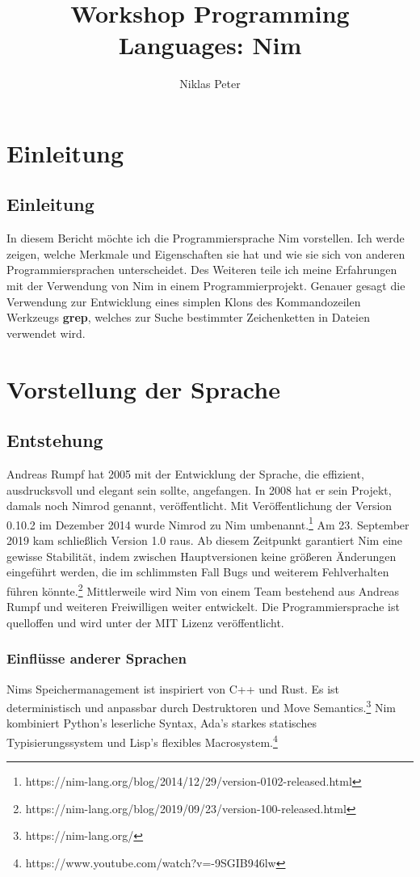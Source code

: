 \documentclass[11pt]{report}
\title{\textbf{Workshop Programming Languages: Nim}}
\author{Niklas Peter}
\date{}
\begin{document}
\maketitle
\tableofcontents


\chapter{Einleitung}
\section{Einleitung}
In diesem Bericht möchte ich die Programmiersprache Nim vorstellen. Ich werde zeigen, welche Merkmale und Eigenschaften sie hat und wie sie sich von anderen Programmiersprachen unterscheidet. Des Weiteren teile ich meine Erfahrungen mit der Verwendung von Nim in einem Programmierprojekt. Genauer gesagt die Verwendung zur Entwicklung eines simplen Klons des Kommandozeilen Werkzeugs \textbf{grep}, welches zur Suche bestimmter Zeichenketten in Dateien verwendet wird.



\chapter{Vorstellung der Sprache}

\section{Entstehung}
Andreas Rumpf hat 2005 mit der Entwicklung der Sprache, die effizient, ausdrucksvoll und elegant sein sollte, angefangen. In 2008 hat er sein Projekt, damals noch Nimrod genannt, veröffentlicht. Mit Veröffentlichung der Version 0.10.2 im Dezember 2014 wurde Nimrod zu Nim umbenannt.\footnote{https://nim-lang.org/blog/2014/12/29/version-0102-released.html} Am 23. September 2019 kam schließlich Version 1.0 raus. Ab diesem Zeitpunkt garantiert Nim eine gewisse Stabilität, indem zwischen Hauptversionen keine größeren Änderungen eingeführt werden, die im schlimmsten Fall Bugs und weiterem Fehlverhalten führen könnte.\footnote{https://nim-lang.org/blog/2019/09/23/version-100-released.html} Mittlerweile wird Nim von einem Team bestehend aus Andreas Rumpf und weiteren Freiwilligen weiter entwickelt. Die Programmiersprache ist quelloffen und wird unter der MIT Lizenz veröffentlicht.

\subsection{Einflüsse anderer Sprachen}
Nims Speichermanagement ist inspiriert von C++ und Rust. Es ist deterministisch und anpassbar durch Destruktoren und Move Semantics.\footnote{https://nim-lang.org/}
\newline
Nim kombiniert Python's leserliche Syntax, Ada's starkes statisches Typisierungssystem und Lisp's flexibles Macrosystem.\footnote{https://www.youtube.com/watch?v=-9SGIB946lw}
\end{document}
